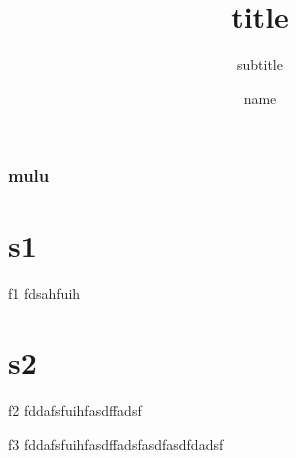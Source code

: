 \documentclass{custombeamer}
\title{title}
\subtitle{subtitle}
\author{name}
\begin{document}
        \titlepage

\setregularbackground
\begin{frame}
    \frametitle{mulu}
    \tableofcontents
\end{frame}

\section{s1}
\setregularbackground
\begin{frame}{f1}
  fdsahfuih
\end{frame}

\section{s2}
\setregularbackground
\begin{frame}{f2}
  fddafsfuihfasdffadsf
\end{frame}

\begin{frame}{f3}
  fddafsfuihfasdffadsfasdfasdfdadsf
\end{frame}

\begin{finalframeone}
\end{finalframeone}

\begin{finalframetwo}
\end{finalframetwo}
\end{document}
